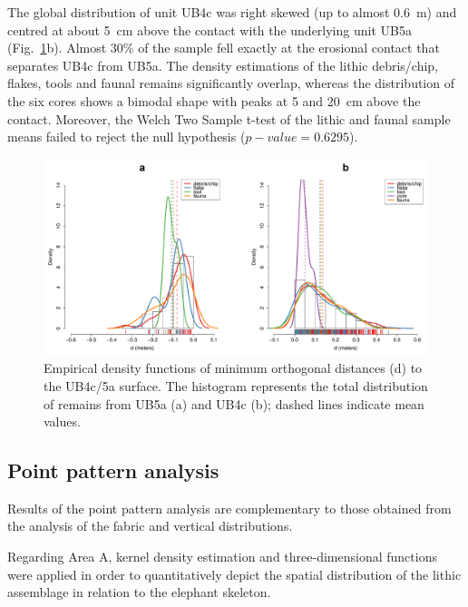 \documentclass[preprint,authoryear,times]{elsarticle} %
\begin{document}
The global distribution of unit UB4c was right skewed (up to almost 0.6~m) and centred at about 5~cm above the contact with the underlying unit UB5a (Fig.~\ref{fig:10}b). Almost 30\% of the sample fell exactly at the erosional contact that separates UB4c from UB5a. The density estimations of the lithic debris/chip, flakes, tools and faunal remains significantly overlap, whereas the distribution of the six cores shows a bimodal shape with peaks at 5 and 20~cm above the contact. Moreover, the Welch Two Sample t-test of the lithic and faunal sample means failed to reject the null hypothesis ($p-value=0.6295$).

\begin{figure}[]
  \centering
  \includegraphics[width=1\textwidth]{../artwork/Fig10.pdf}
  \caption{Empirical density functions of minimum orthogonal distances (d) to the UB4c/5a surface. The histogram represents the total distribution of remains from UB5a (a) and UB4c (b); dashed lines indicate mean values.}
  \label{fig:10}
\end{figure}

\subsection{Point pattern analysis}

Results of the point pattern analysis are complementary to those obtained from the analysis of the fabric and vertical distributions.  


Regarding Area A, kernel density estimation and three-dimensional functions were applied in order to quantitatively depict the spatial distribution of the lithic assemblage in relation to the elephant skeleton.
\end{document}
